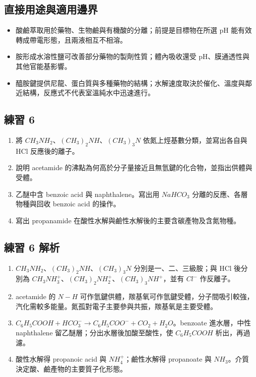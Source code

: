 \documentclass[11pt,a4paper]{article}
\providecommand{\tightlist}{%
  \setlength{\itemsep}{0pt}\setlength{\parskip}{0pt}}
\begin{document}
\subsection{直接用途與適用邊界}\label{ux76f4ux63a5ux7528ux9014ux8207ux9069ux7528ux908aux754c-5}

\begin{itemize}
\tightlist
\item
  酸鹼萃取用於藥物、生物鹼與有機酸的分離；前提是目標物在所選 pH 能有效轉成帶電形態，且兩液相互不相溶。
\item
  胺形成水溶性鹽可改善部分藥物的製劑性質；體內吸收還受 pH、膜通透性與其他官能基影響。
\item
  醯胺鍵提供尼龍、蛋白質與多種藥物的結構；水解速度取決於催化、溫度與鄰近結構，反應式不代表室溫純水中迅速進行。
\end{itemize}

\subsection{練習 6}\label{ux7df4ux7fd2-6}

\begin{enumerate}
\def\labelenumi{\arabic{enumi}.}
\tightlist
\item
  將 \(CH_3NH_2\)、\((CH_3)_2NH\)、\((CH_3)_3N\) 依氮上烴基數分類，並寫出各自與 HCl 反應後的離子。
\item
  說明 acetamide 的沸點為何高於分子量接近且無氫鍵的化合物，並指出供體與受體。
\item
  乙醚中含 benzoic acid 與 naphthalene。寫出用 \(NaHCO_3\) 分離的反應、各層物種與回收 benzoic acid 的操作。
\item
  寫出 propanamide 在酸性水解與鹼性水解後的主要含碳產物及含氮物種。
\end{enumerate}

\subsection{練習 6 解析}\label{ux7df4ux7fd2-6-ux89e3ux6790}

\begin{enumerate}
\def\labelenumi{\arabic{enumi}.}
\tightlist
\item
  \(CH_3NH_2\)、\((CH_3)_2NH\)、\((CH_3)_3N\) 分別是一、二、三級胺；與 HCl 後分別為 \(CH_3NH_3^+\)、\((CH_3)_2NH_2^+\)、\((CH_3)_3NH^+\)，並有 \(Cl^-\) 作反離子。
\item
  acetamide 的 \(N-H\) 可作氫鍵供體，羰基氧可作氫鍵受體，分子間吸引較強，汽化需較多能量。氮孤對電子主要參與共振，羰基氧是主要受體。
\item
  \(C_6H_5COOH+HCO_3^-\rightarrow C_6H_5COO^-+CO_2+H_2O\)。benzoate 進水層，中性 naphthalene 留乙醚層；分出水層後加酸至酸性，使 \(C_6H_5COOH\) 析出，再過濾。
\item
  酸性水解得 propanoic acid 與 \(NH_4^+\)；鹼性水解得 propanoate 與 \(NH_3\)。介質決定酸、鹼產物的主要質子化形態。
\end{enumerate}
\end{document}
